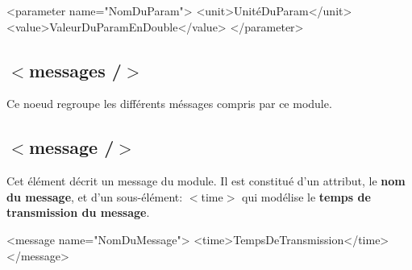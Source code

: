 \begin{DoxyCode}
<parameter name=\textcolor{stringliteral}{"NomDuParam"}>
    <unit>UnitéDuParam</unit>
    <value>ValeurDuParamEnDouble</value>
</parameter>
\end{DoxyCode}
\hypertarget{xmlRef_xml_mod_messs}{}\subsection{$<$messages /$>$}\label{xmlRef_xml_mod_messs}
Ce noeud regroupe les différents méssages compris par ce module.\hypertarget{xmlRef_xml_mod_mess}{}\subsection{$<$message /$>$}\label{xmlRef_xml_mod_mess}
Cet élément décrit un message du module. Il est constitué d'un attribut, le {\bfseries nom du message}, et d'un sous-\/élément\-: $<$time$>$ qui modélise le {\bfseries temps de transmission du message}.


\begin{DoxyCode}
<message name=\textcolor{stringliteral}{"NomDuMessage"}>
    <time>TempsDeTransmission</time>
</message>
\end{DoxyCode}
 